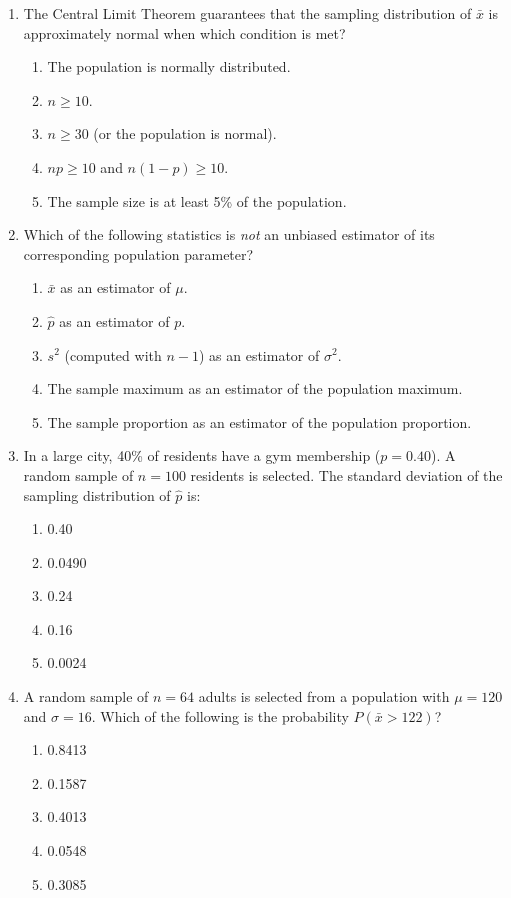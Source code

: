 \documentclass[10pt]{article}
\begin{document}
\begin{enumerate}
  \item The Central Limit Theorem guarantees that the sampling distribution of $\bar{x}$
        is approximately normal when which condition is met?
    \begin{enumerate}[label=(\Alph*)]
      \item The population is normally distributed.
      \item $n \ge 10$.
      \item $n \ge 30$ (or the population is normal).
      \item $np \ge 10$ and $n(1-p) \ge 10$.
      \item The sample size is at least 5\% of the population.
    \end{enumerate}

  \item Which of the following statistics is \emph{not} an unbiased estimator of its
        corresponding population parameter?
    \begin{enumerate}[label=(\Alph*)]
      \item $\bar{x}$ as an estimator of $\mu$.
      \item $\hat{p}$ as an estimator of $p$.
      \item $s^2$ (computed with $n-1$) as an estimator of $\sigma^2$.
      \item The sample maximum as an estimator of the population maximum.
      \item The sample proportion as an estimator of the population proportion.
    \end{enumerate}

  \item In a large city, 40\% of residents have a gym membership ($p = 0.40$). A random
        sample of $n = 100$ residents is selected. The standard deviation of the sampling
        distribution of $\hat{p}$ is:
    \begin{enumerate}[label=(\Alph*)]
      \item 0.40 \item 0.0490 \item 0.24 \item 0.16 \item 0.0024
    \end{enumerate}

  \item A random sample of $n = 64$ adults is selected from a population with $\mu = 120$
        and $\sigma = 16$. Which of the following is the probability $P(\bar{x} > 122)$?
    \begin{enumerate}[label=(\Alph*)]
      \item 0.8413 \item 0.1587 \item 0.4013 \item 0.0548 \item 0.3085
    \end{enumerate}


\end{enumerate}
\end{document}
